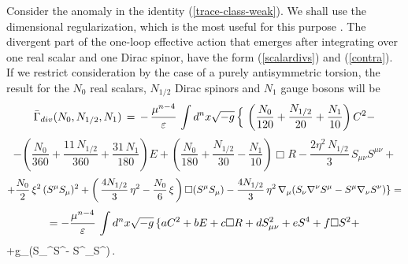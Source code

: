 Consider the anomaly in 
the identity (\ref{trace-class-weak}). We shall use the
dimensional regularization, which is the most useful for
this purpose \cite{ddi,duff}. The divergent part of the 
one-loop effective action that emerges after integrating 
over one real scalar and one Dirac spinor, have 
the form (\ref{scalardivs}) and (\ref{contra}). If we 
restrict consideration by the case of a purely 
antisymmetric torsion, the result for the 
$N_0$ real scalars, $N_{1/2}$ Dirac spinors and 
$N_1$ gauge bosons will be
$$
{\bar {\Gamma}_{div}}(N_0, N_{1/2}, N_1) \,=\, 
-\, \frac{\mu^{n-4}}{\varepsilon}\,\int d^n x\sqrt{-g}\,\Big\{ 
\,\left( \frac{N_0}{120} + \frac{N_{1/2}}{20}
+ \frac{N_1}{10} \right) C^2 -
$$
$$
- \left( \frac{N_0}{360} + \frac{11\,N_{1/2}}{360}
+ \frac{31\,N_1}{180}\right) E + 
 \left( \frac{N_0}{180} + \frac{N_{1/2}}{30}
- \frac{N_1}{10}\right) {\Box} R 
- \frac{2\eta^2\,N_{1/2}}{3}\,S_{\mu\nu}S^{\mu\nu} +
$$
$$
+\frac{N_0}{2}\,\xi^2\,(S^\mu S_\mu)^2
+\left(\,\frac{4N_{1/2}}{3}\,\eta^2-\frac{N_0}{6}\,\xi
\,\right){\Box}(S^\mu S_\mu) 
- \frac{4N_{1/2}}{3}\,\eta^2\,
\nabla_\mu(S_\nu\nabla^\nu S^\mu - S^\mu\nabla_\nu S^\nu) \}=
$$
\vskip 2mm
$$
=- \frac{\mu^{n-4}}{\varepsilon}\,\int d^n x\sqrt{-g}\,\{ 
aC^2+bE+c{\Box}R+dS^2_{\mu\nu}+eS^4+f{\Box}S^2+
$$
\beq
+g\na_\mu(S_\nu\na^\nu S^\mu - S^\mu\na_\nu S^\nu)\,. 
\label{1d}
\eeq

